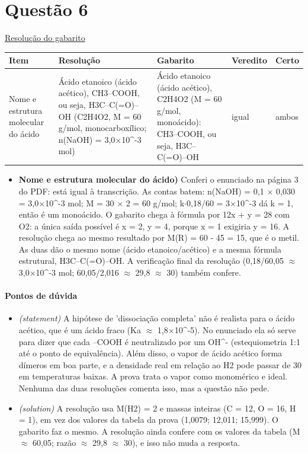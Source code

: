 \documentclass{article}%
\begin{document}
\section*{Questão 6}%
\href{https://poliedroresolve.sistemapoliedro.com.br/vestibulares/ime/2026/ime-2-fase-dia-3-25-10-2025-2-fase-dia-3/dissertativa-6-quimica-2-fase-dia-3-ime-2026}{Resolução do gabarito}\par\smallskip%
\begin{longtable}{@{}p{} p{} p{} p{} p{}@{}}\toprule Item & Resolução & Gabarito & Veredito & Certo \\ \midrule
Nome e estrutura molecular do ácido & Ácido etanoico (ácido acético), CH3--COOH, ou seja, H3C--C(=O)--OH (C2H4O2, M = 60 g/mol, monocarboxílico; n(NaOH) = 3,0$\times$10\^{}{-}3 mol) & Ácido etanoico (ácido acético), C2H4O2 (M = 60 g/mol, monoácido): CH3--COOH, ou seja, H3C--C(=O)--OH & igual & ambos \\
\bottomrule\end{longtable}%
\begin{itemize}%
\item%
\textbf{Nome e estrutura molecular do ácido)} Conferi o enunciado na página 3 do PDF: está igual à transcrição. As contas batem: n(NaOH) = 0,1 $\times$ 0,030 = 3,0$\times$10\^{}{-}3 mol; M = 30 $\times$ 2 = 60 g/mol; k$\cdot$0,18/60 = 3$\times$10\^{}{-}3 dá k = 1, então é um monoácido. O gabarito chega à fórmula por 12x + y = 28 com O2: a única saída possível é x = 2, y = 4, porque x = 1 exigiria y = 16. A resolução chega ao mesmo resultado por M(R) = 60 - 45 = 15, que é o metil. As duas dão o mesmo nome (ácido etanoico/acético) e a mesma fórmula estrutural, H3C--C(=O)--OH. A verificação final da resolução (0,18/60,05 $\approx$ 3,0$\times$10\^{}{-}3 mol; 60,05/2,016 $\approx$ 29,8 $\approx$ 30) também confere.%
\end{itemize}%
\paragraph{Pontos de dúvida}%
\begin{itemize}%
\item%
\textit{(statement)} A hipótese de 'dissociação completa' não é realista para o ácido acético, que é um ácido fraco (Ka $\approx$ 1,8$\times$10\^{}{-}5). No enunciado ela só serve para dizer que cada --COOH é neutralizado por um OH\^{}{-} (estequiometria 1:1 até o ponto de equivalência). Além disso, o vapor de ácido acético forma dímeros em boa parte, e a densidade real em relação ao H2 pode passar de 30 em temperaturas baixas. A prova trata o vapor como monomérico e ideal. Nenhuma das duas resoluções comenta isso, mas a questão não pede.%
\item%
\textit{(solution)} A resolução usa M(H2) = 2 e massas inteiras (C = 12, O = 16, H = 1), em vez dos valores da tabela da prova (1,0079; 12,011; 15,999). O gabarito faz o mesmo. A resolução ainda confere com os valores da tabela (M $\approx$ 60,05; razão $\approx$ 29,8 $\approx$ 30), e isso não muda a resposta.%
\end{itemize}%
\end{document}
